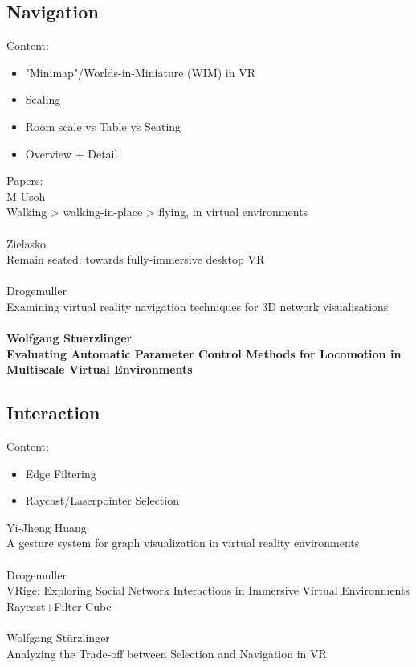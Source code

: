 \subsection{Navigation}
Content:
\begin{itemize}
    \item "Minimap"/Worlds-in-Miniature (WIM) in VR
    \item Scaling
    \item Room scale vs Table vs Seating
    \item Overview + Detail 
\end{itemize}

Papers: \\

M Usoh\\
Walking > walking-in-place > flying, in virtual environments\\
\\
Zielasko\\
Remain seated: towards fully-immersive desktop VR\\
\\
Drogemuller\\
Examining virtual reality navigation techniques for 3D network visualisations\\
\\
\textbf{Wolfgang Stuerzlinger\\
Evaluating Automatic Parameter Control Methods for
Locomotion in Multiscale Virtual Environments\\}


\subsection{Interaction}
Content: 
\begin{itemize}
    \item Edge Filtering
    \item Raycast/Laserpointer Selection
\end{itemize}

Yi-Jheng Huang\\
A gesture system for graph visualization in virtual reality environments\\
\\
Drogemuller\\
VRige: Exploring Social Network Interactions in Immersive Virtual Environments\\
Raycast+Filter Cube\\
\\
Wolfgang Stürzlinger\\
Analyzing the Trade-off between Selection and Navigation in VR\\



